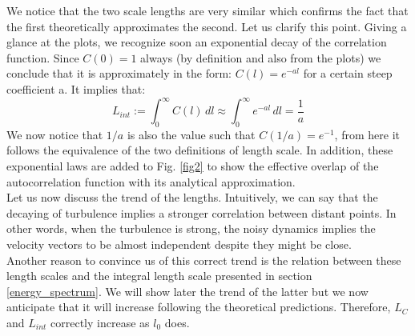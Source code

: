 \documentclass[11pt,titlepage]{article}
\begin{document}
We notice that the two scale lengths are very similar which confirms the fact that the first theoretically approximates the second. Let us clarify this point. Giving a glance at the plots, we recognize soon an exponential decay of the correlation function. Since $C(0)=1$ always (by definition and also from the plots) we conclude that it is approximately in the form: $C(l) = e^{-al}$ for a certain steep coefficient a. It implies that:
\begin{equation*}
	L_{int} := \int_0^{\infty} C(l)\, dl \approx  \int_0^{\infty} e^{-al}\, dl = \frac{1}{a}
\end{equation*}
We now notice that $1/a$ is also the value such that $C(1/a) = e^{-1}$, from here it follows the equivalence of the two definitions of length scale. In addition, these exponential laws are added to Fig. \ref{fig2} to show the effective overlap of the autocorrelation function with its analytical approximation.\\
Let us now discuss the trend of the lengths. Intuitively, we can say that the decaying of turbulence implies a stronger correlation between distant points. In other words, when the turbulence is strong, the noisy dynamics implies the velocity vectors to be almost independent despite they might be close. \\ 
Another reason to convince us of this correct trend is the relation between these length scales and the integral length scale presented in section \ref{energy_spectrum}. We will show later the trend of the latter but we now anticipate that it will increase following the theoretical predictions. Therefore, $L_C$ and $L_{int}$ correctly increase as $l_0$ does.
\end{document}
